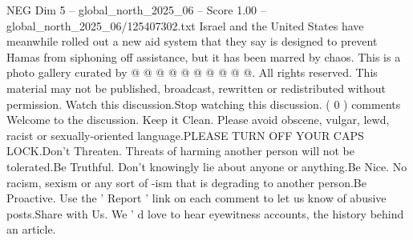\begin{textsample}{NEG Dim 5 – global\_north\_2025\_06 – Score 1.00 – global\_north\_2025\_06/125407302.txt}
Israel and the United States have meanwhile rolled out a new aid system that they say is designed to prevent Hamas from siphoning off assistance, but it has been marred by chaos.
This is a photo gallery curated by @ @ @ @ @ @ @ @ @ @.
All rights reserved.
This material may not be published, broadcast, rewritten or redistributed without permission.
Watch this discussion.Stop watching this discussion. ( 0 ) comments Welcome to the discussion.
Keep it Clean.
Please avoid obscene, vulgar, lewd, racist or sexually-oriented language.PLEASE TURN OFF YOUR CAPS LOCK.Don't Threaten.
Threats of harming another person will not be tolerated.Be Truthful.
Don't knowingly lie about anyone or anything.Be Nice.
No racism, sexism or any sort of -ism that is degrading to another person.Be Proactive.
Use the ' Report ' link on each comment to let us know of abusive posts.Share with Us.
We ' d love to hear eyewitness accounts, the history behind an article.

\end{textsample}
